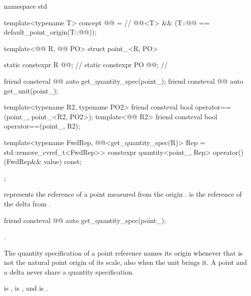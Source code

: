 \begin{codeblock}
namespace std {

template<typename T>
concept @@ =                       // \expos
  @@<T> &&
  (T::@@ == default_point_origin(T::@@));

template<@@ R, @@ PO>
struct point_<R, PO> {
  static constexpr R @@{};  // \expos
  static constexpr PO @@{};     // \expos

  friend consteval @@ auto get_quantity_spec(point_);
  friend consteval @@ auto get_unit(point_);

  template<typename R2, typename PO2>
  friend consteval bool operator==(point_, point_<R2, PO2>);
  template<@@ R2>
  friend consteval bool operator==(point_, R2);

  template<typename FwdRep,
           @@<get_quantity_spec(R{})> Rep = std::remove_cvref_t<FwdRep>>
  constexpr quantity<point_{}, Rep> operator()(FwdRep&& value) const;
};

}
\end{codeblock}

\pnum
{} represents the reference of a point
measured from the origin .
 is the reference of the delta from .

\begin{itemdecl}
friend consteval @@ auto get_quantity_spec(point_);
\end{itemdecl}

\begin{itemdescr}
\pnum
\returns
{}.

\pnum
\begin{note}
The quantity specification of a point reference names its origin
whenever that is not the natural point origin of its scale, also when the unit brings it.
A point and a delta never share a quantity specification.
\end{note}
\begin{example}
 is ,
 is
, and
 is
.
\end{example}
\end{itemdescr}

